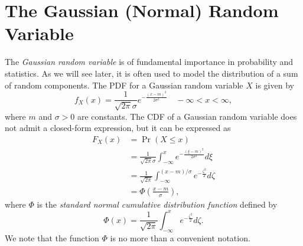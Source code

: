\section{The Gaussian (Normal) Random Variable}

The \emph{Gaussian random variable} is of fundamental importance in probability and statistics.
As we will see later, it is often used to model the distribution of a sum of random components.
The PDF for a Gaussian random variable $X$ is given by
\begin{equation*}
f_X (x) = \frac{1}{\sqrt{2 \pi} \sigma} e^{- \frac{(x - m)^2}{2 \sigma^2}}
\quad - \infty < x < \infty,
\end{equation*}
where $m$ and $\sigma > 0$ are constants.
The CDF of a Gaussian random variable does not admit a closed-form expression, but it can be expressed as
\begin{equation*}
\begin{split}
F_X (x) &= \Pr (X \leq x) \\
&= \frac{1}{\sqrt{2 \pi} \sigma}
\int_{- \infty}^{x} e^{- \frac{(\xi - m)^2}{2 \sigma^2}} d\xi \\
&= \frac{1}{\sqrt{2 \pi}}
\int_{- \infty}^{(x - m)/\sigma} e^{- \frac{\zeta^2}{2}} d\zeta \\
&= \Phi \left( \frac{x - m}{\sigma} \right),
\end{split}
\end{equation*}
where $\Phi$ is the \emph{standard normal cumulative distribution function} defined by
\begin{equation*}
\Phi (x) = 
\frac{1}{\sqrt{2 \pi}} \int_{-\infty}^x e^{-\frac{\zeta^2}{2}} d\zeta .
\end{equation*}
We note that the function $\Phi$ is no more than a convenient notation.

